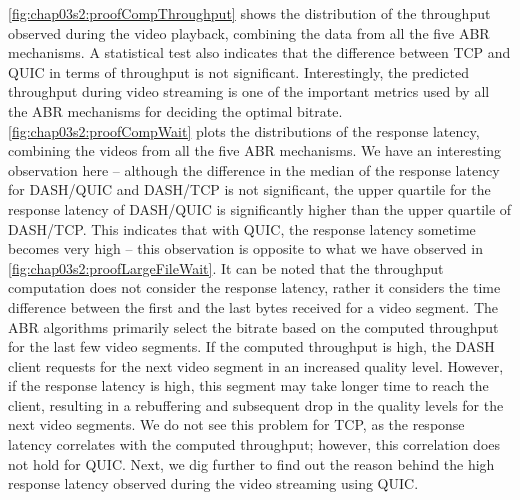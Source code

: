 \fig\ref{fig:chap03s2:proofCompThroughput} shows the distribution of the throughput observed during the video playback, combining the data from all the five ABR mechanisms. A statistical test also indicates that the difference between TCP and QUIC in terms of throughput is not significant. Interestingly, the predicted throughput during video streaming is one of the important metrics used by all the ABR mechanisms for deciding the optimal bitrate. \fig\ref{fig:chap03s2:proofCompWait} plots the distributions of the response latency, combining the videos from all the five ABR mechanisms. We have an interesting observation here -- although the difference in the median of the response latency for DASH/QUIC and DASH/TCP is not significant,  the upper quartile for the response latency of DASH/QUIC is significantly higher than the upper quartile of DASH/TCP. This indicates that with QUIC, the response latency sometime becomes very high -- this observation is opposite to what we have observed in \fig\ref{fig:chap03s2:proofLargeFileWait}. It can be noted that the throughput computation does not consider the response latency, rather it considers the time difference between the first and the last bytes received for a video segment. The ABR algorithms primarily select the bitrate based on the computed throughput for the last few video segments. If the computed throughput is high, the DASH client requests for the next video segment in an increased quality level. However, if the response latency is high, this segment may take longer time to reach the client, resulting in a rebuffering and subsequent drop in the quality levels for the next video segments. We do not see this problem for TCP, as the response latency correlates with the computed throughput; however, this correlation does not hold for QUIC. Next, we dig further to find out the reason behind the high response latency observed during the video streaming using QUIC.

